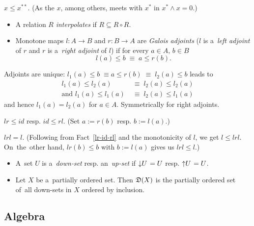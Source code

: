 \begin{fact}
  $x \le x^{**}$.
  (As the $x$, among others, meets with $x^*$ in $x^* \wedge x = 0$.)
\end{fact}

\begin{itemize}
\item A relation $R$ \emph{interpolates} if $R \subseteq R \circ R$.

\item Monotone maps $l\colon A \to B$ and $r\colon B \to A$ are \emph{Galois
  adjoints\/} ($l$ is a~\emph{left adjoint\/} of $r$ and $r$ is a~\emph{right
  adjoint\/} of $l$) if for every $a\in A, \, b\in B$
  \[
    l(a) \le b \; \equiv \; a \le r(b).
  \]
\end{itemize}

\begin{rem}
  Adjoints are unique: $l_1(a) \le b \; \equiv a \le r(b) \; \equiv \; l_2(a)
  \le b$ leads to
  \begin{align*}
    l_1(a) \le l_2(a) \; &\equiv \; l_2(a) \le l_2(a) \\
    \text{and } l_1(a) \le l_1(a) \; &\equiv \; l_2(a) \le l_1(a)
  \end{align*}
  and hence $l_1(a) = l_2(a)$ for $a\in A$.
  Symmetrically for right adjoints.
\end{rem}

\begin{fact} \label{lr-id-rl}
  $lr \le id$ resp. $id \le rl$.
  (Set $a := r(b)$ resp. $b := l(a)$.)
\end{fact}

\begin{fact} \label{lrl=l}
  $lrl = l$.
  (Following from Fact~\ref{lr-id-rl} and the monotonicity of $l$, we get $l
   \le lrl$.
  On~the~other hand, $lr(b) \le b$ with $b := l(a)$ gives us $lrl \le l$.)
\end{fact}

\begin{itemize}
\item A~set $U$ is a~\emph{down-set\/} resp. an~\emph{up-set\/} if
$\left\downarrow U \right. = U$ resp. $\left\uparrow U \right. = U$.

\item Let $X$ be a~partially ordered set.
Then $\mathfrak{D}(X)$ is the partially ordered set of~all down-sets in $X$ ordered by
inclusion.

\end{itemize}

\subsection*{Algebra}


